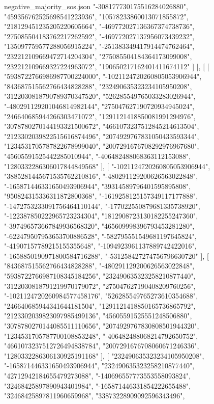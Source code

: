 \begin{filecontents*}[overwrite]{negative_majority_sos.json}
    "-308177730175516284026880",
    "459356762525698541223936",
    "10578233860013071855872",
    "218129451235205220605664",
    "-469772027136367374738736",
    "275085504183762217262592",
    "-469772027137956073439232",
    "135097759577288056915224",
    "-251383349417914474762464",
    "232212109669472714204304",
    "275085504184364173099008",
    "232212109669327224963072",
    "190650217162401411674112"
   ]
  ],
  [
   [
    "5938722766986987700224000",
    "-1021124720260805053906944",
    "843687515562766434828288",
    "232490635323234105950208",
    "3122030818790789370347520",
    "526285549765033283026944",
    "-480291129201046814982144",
    "275047627190720934945024",
    "246640685944266303471072",
    "1291121418850081991294976",
    "3078780270144193321500672",
    "4661073237512845214613504",
    "2123302039822515616874496",
    "2074929767831050433593344",
    "1234531705787822678999040",
    "2007291676708292976967680",
    "45605591525442285010944",
    "-406482488068363112153088",
    "1280332286306017844849568"
   ],
   [
    "-1021124720260805053906944",
    "3885281445671535762210816",
    "-480291129200626563022848",
    "-165871446331650493906944",
    "39314589796401595895808",
    "950824315336311872800368",
    "-1619258125157349117177888",
    "-1472753233091756464110144",
    "-177022550879681335738920",
    "-122387850222965723234304",
    "1812908723130182255247360",
    "-397496573667849936568320",
    "465609998396793453281280",
    "-622479507953653700886528",
    "-582795551549681197645824",
    "-41907157789215155355648",
    "-1094923961137889742422016",
    "-1658850190971800584716288",
    "-531258427274756796630720"
   ],
   [
    "843687515562766434828288",
    "-480291129200626563022848",
    "5938722766987108345184256",
    "232490635323258210877440",
    "3122030818791219970179072",
    "275047627190408209760256",
    "-1021124720260984577458176",
    "526285549765273610354688",
    "246640685944341644181504",
    "1291121418850165736865792",
    "2123302039823097985499136",
    "45605591525551248506880",
    "3078780270144085511110656",
    "2074929767830808501944320",
    "1234531705787700108853248",
    "-406482488068214792650752",
    "4661073237512726494838784",
    "2007291676708060671246336",
    "1280332286306130925191168"
   ],
   [
    "232490635323234105950208",
    "-165871446331650493906944",
    "232490635323258210877440",
    "42712942184655479273088",
    "-140696557773553558093824",
    "32468425897890943401984",
    "-165871446331854222655488",
    "32468425897811960659968",
    "33873228909092596343496",

\end{filecontents*}
